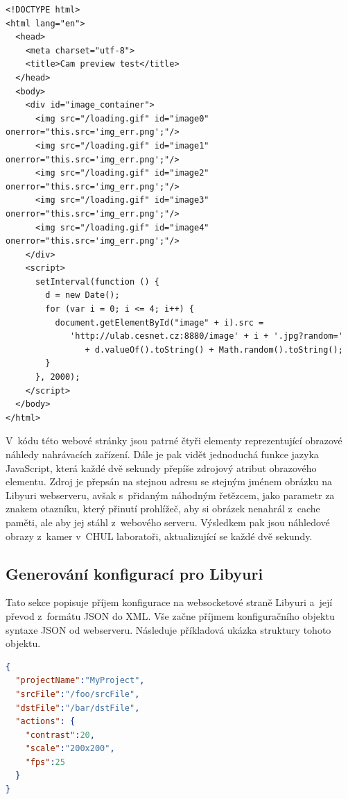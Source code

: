 \documentclass[thesis=M,czech]{FITthesis}[2012/06/26]
\begin{document}
\begin{lstlisting}[style=htmlcssjs]
<!DOCTYPE html>
<html lang="en">
  <head>
    <meta charset="utf-8">
    <title>Cam preview test</title>
  </head>
  <body>
    <div id="image_container">
      <img src="/loading.gif" id="image0" onerror="this.src='img_err.png';"/>
      <img src="/loading.gif" id="image1" onerror="this.src='img_err.png';"/>
      <img src="/loading.gif" id="image2" onerror="this.src='img_err.png';"/>
      <img src="/loading.gif" id="image3" onerror="this.src='img_err.png';"/>
      <img src="/loading.gif" id="image4" onerror="this.src='img_err.png';"/>
    </div>
    <script>
      setInterval(function () {
        d = new Date();
        for (var i = 0; i <= 4; i++) {
          document.getElementById("image" + i).src = 
             'http://ulab.cesnet.cz:8880/image' + i + '.jpg?random='
                + d.valueOf().toString() + Math.random().toString();
        }
      }, 2000);
    </script>
  </body>
</html>
\end{lstlisting}

V~kódu této webové stránky jsou patrné čtyři elementy  reprezentující obrazové náhledy nahrávacích zařízení. Dále je pak vidět jednoduchá funkce jazyka JavaScript, která každé dvě sekundy přepíše zdrojový atribut obrazového elementu. Zdroj je přepsán na stejnou adresu se stejným jménem obrázku na Libyuri webserveru, avšak s~přidaným náhodným řetězcem, jako parametr za znakem otazníku, který přinutí prohlížeč, aby si obrázek nenahrál z~cache paměti, ale aby jej stáhl z~webového serveru. Výsledkem pak jsou náhledové obrazy z~kamer v~CHUL laboratoři, aktualizující se každé dvě sekundy.


\subsection{Generování konfigurací pro Libyuri} \label{subsec:impl_funkce_generate}
Tato sekce popisuje příjem konfigurace na websocketové straně Libyuri a~její převod z~formátu JSON do XML. Vše začne příjmem konfiguračního objektu syntaxe JSON od webserveru. Následuje příkladová ukázka struktury tohoto objektu.\\

\begin{lstlisting}[language=json]
{
  "projectName":"MyProject",
  "srcFile":"/foo/srcFile",
  "dstFile":"/bar/dstFile",
  "actions": {
    "contrast":20,
    "scale":"200x200",
    "fps":25
  }
}
\end{lstlisting}
\end{document}
